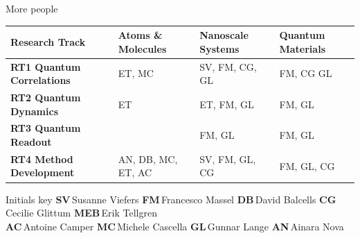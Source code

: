 \documentclass[aspectratio=169,10pt]{beamer}
\begin{document}
\begin{frame}{More people}
  \renewcommand{\arraystretch}{1.3}
  \small
  \begin{tabular}{>{\bfseries}p{4.0cm}
                  >{\centering\arraybackslash}p{3.0cm}
                  >{\centering\arraybackslash}p{3.0cm}
                  >{\centering\arraybackslash}p{3.0cm}}
    \toprule
    Research Track
      & \textbf{Atoms \& Molecules}
      & \textbf{Nanoscale Systems}
      & \textbf{Quantum Materials} \\
    \midrule
    RT1 Quantum Correlations & ET, MC & SV, FM, CG, GL & FM, CG GL  \\
    RT2 Quantum Dynamics     & ET  & ET, FM, GL & FM, GL \\
    RT3 Quantum Readout      &  & FM, GL & FM, GL  \\
    RT4 Method Development   & AN, DB, MC, ET, AC & SV, FM, GL, CG & FM, GL, CG  \\
  \end{tabular}
  \vspace{4pt}
  \begin{block}{Initials key}
    \footnotesize
    \textbf{SV}\,Susanne Viefers\quad
    \textbf{FM}\,Francesco Massel\quad
    \textbf{DB}\,David Balcells\quad
        \textbf{CG}\,Cecilie Glittum\quad
    \textbf{MEB}\,Erik Tellgren\\[2pt]
    \textbf{AC}\,Antoine Camper\quad
    \textbf{MC}\,Michele Cascella\quad
            \textbf{GL}\,Gunnar Lange\quad
    \textbf{AN}\,Ainara Nova
  \end{block}

\end{frame}
\end{document}
